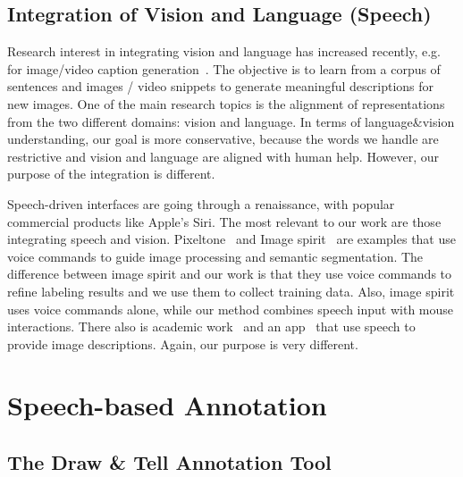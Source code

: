 \documentclass[runningheads]{llncs}
\begin{document}
\subsection{Integration of Vision and Language (Speech)}
Research interest in integrating vision and language has increased
recently, e.g. for image/video caption generation~\citep{ show:tell:caption, youtube2text,
  fgm:coling14, deep:alignment:vl, babytalk}.  The objective is to
learn from a corpus of sentences and images / video snippets to
generate meaningful descriptions for new images. One of the main
research topics is the alignment of representations from the two
different domains: vision and language. In terms of language\&vision
understanding, our goal is more conservative, because the words we
handle are restrictive and vision and language are aligned with human
help.  However, our purpose of the integration is different.

Speech-driven interfaces are going through a renaissance, with popular
commercial products like Apple's Siri. The most relevant to our work
are those integrating speech and vision. Pixeltone~\citep{pixel:tone}
and Image spirit~\citep{image:spirit} are examples that use voice
commands to guide image processing and semantic segmentation. The
difference between image spirit and our work is that they use voice
commands to refine labeling results and we use them to collect
training data. Also, image spirit uses voice commands alone, while our
method combines speech input with mouse interactions. There also is
academic work~\citep{show:tell, speech:anno:img, speech:retri:img,
  video:anno:knowledgebase} and an app~\citep{smile} that use speech to
provide image descriptions.  Again, our purpose is very different.


\section{Speech-based Annotation}
\label{sec:annotation}

\subsection{The Draw \& Tell Annotation Tool}
\end{document}
